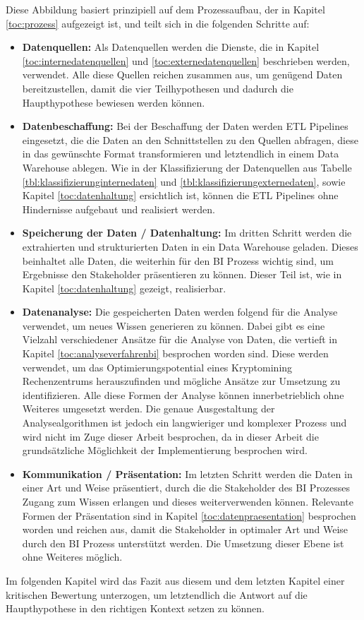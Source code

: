 Diese Abbildung basiert prinzipiell auf dem Prozessaufbau, der in Kapitel \ref{toc:prozess} aufgezeigt ist, und teilt sich in die folgenden
Schritte auf:
\begin{itemize}
    \item \textbf{Datenquellen: }Als Datenquellen werden die Dienste, die in Kapitel \ref{toc:internedatenquellen} und \ref{toc:externedatenquellen}
    beschrieben werden, verwendet. Alle diese Quellen reichen zusammen aus, um genügend Daten bereitzustellen, damit die vier Teilhypothesen und
    dadurch die Haupthypothese bewiesen werden können.
    \item \textbf{Datenbeschaffung: }Bei der Beschaffung der Daten werden \ac{ETL} Pipelines eingesetzt, die die Daten an den Schnittstellen
    zu den Quellen abfragen, diese in das gewünschte Format transformieren und letztendlich in einem Data Warehouse ablegen. Wie
    in der Klassifizierung der Datenquellen aus Tabelle \ref{tbl:klassifizierunginternedaten} und \ref{tbl:klassifizierungexternedaten},
    sowie Kapitel \ref{toc:datenhaltung} ersichtlich ist, können die \ac{ETL} Pipelines ohne Hindernisse aufgebaut und realisiert werden.
    \item \textbf{Speicherung der Daten / Datenhaltung: }Im dritten Schritt werden die extrahierten und strukturierten Daten in ein Data Warehouse
    geladen. Dieses beinhaltet alle Daten, die weiterhin für den \ac{BI} Prozess wichtig sind, um Ergebnisse den Stakeholder präsentieren zu können.
    Dieser Teil ist, wie in Kapitel \ref{toc:datenhaltung} gezeigt, realisierbar.
    \item \textbf{Datenanalyse: }Die gespeicherten Daten werden folgend für die Analyse verwendet, um neues Wissen generieren zu können.
    Dabei gibt es eine Vielzahl verschiedener Ansätze für die Analyse von Daten, die vertieft in Kapitel \ref{toc:analyseverfahrenbi}
    besprochen worden sind. Diese werden verwendet, um das Optimierungspotential eines Kryptomining Rechenzentrums herauszufinden und
    mögliche Ansätze zur Umsetzung zu identifizieren. Alle diese Formen der Analyse können innerbetrieblich
    ohne Weiteres umgesetzt werden. Die genaue Ausgestaltung der Analysealgorithmen ist jedoch ein langwieriger und komplexer Prozess
    und wird nicht im Zuge dieser Arbeit besprochen, da in dieser Arbeit die grundsätzliche Möglichkeit der Implementierung besprochen wird.
    \item \textbf{Kommunikation / Präsentation: }Im letzten Schritt werden die Daten in einer Art und Weise präsentiert, 
    durch die die Stakeholder des \ac{BI} Prozesses Zugang zum Wissen erlangen und dieses weiterverwenden können.
    Relevante Formen der Präsentation sind in
    Kapitel \ref{toc:datenpraesentation} besprochen worden und reichen aus, damit die Stakeholder in optimaler Art und Weise durch den
    \ac{BI} Prozess unterstützt werden. Die Umsetzung dieser Ebene ist ohne Weiteres möglich.
\end{itemize}

Im folgenden Kapitel wird das Fazit aus diesem und dem letzten Kapitel einer kritischen Bewertung unterzogen, um
letztendlich die Antwort auf die Haupthypothese in den richtigen Kontext setzen zu können.
